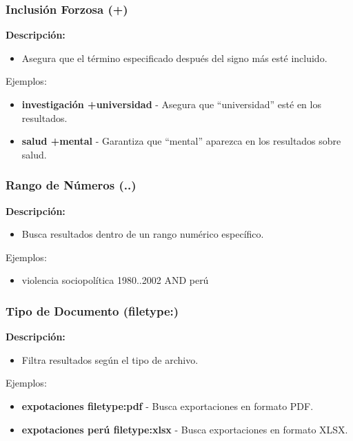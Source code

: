 \documentclass[
11pt, %
]{beamer}
\begin{document}
\begin{frame}
	\frametitle{Inclusión Forzosa (+)}
	\textbf{Descripción:}
	\begin{itemize}
		\item Asegura que el término especificado después del signo más esté incluido.
	\end{itemize}

	\begin{exampleblock}{Ejemplos:}
		\begin{itemize}
			\item \textbf{investigación +universidad }- Asegura que ``universidad'' esté en los resultados.
			\item \textbf{salud +mental} - Garantiza que ``mental'' aparezca en los resultados sobre salud.
		\end{itemize}
	\end{exampleblock}
\end{frame}

\begin{frame}
	\frametitle{Rango de Números (..)}
	\textbf{Descripción:}
	\begin{itemize}
		\item Busca resultados dentro de un rango numérico específico.
	\end{itemize}

	\begin{exampleblock}{Ejemplos:}
		\begin{itemize}
			\item violencia sociopolítica 1980..2002 AND perú
		\end{itemize}
	\end{exampleblock}

\end{frame}

\begin{frame}
	\frametitle{Tipo de Documento (filetype:)}
	\textbf{Descripción:}
	\begin{itemize}
		\item Filtra resultados según el tipo de archivo.
	\end{itemize}
	\begin{exampleblock}{Ejemplos:}
		\begin{itemize}
			\item \textbf{expotaciones filetype:pdf} - Busca exportaciones en formato PDF.
			\item \textbf{expotaciones perú filetype:xlsx} - Busca exportaciones en formato XLSX.
		\end{itemize}
	\end{exampleblock}

\end{frame}
\end{document}

